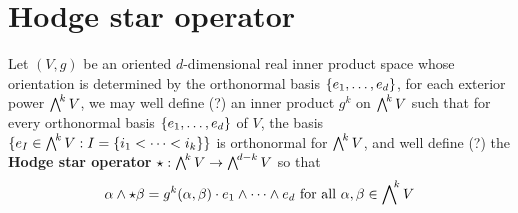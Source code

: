 \documentclass{report}
\begin{document}
\section{Hodge star operator}
Let $(V,g)$ be an oriented $d$-dimensional real inner product space whose orientation is determined by the orthonormal basis $\{ e_1,\dots ,e_d \}$, for each exterior power $\extp^k V$, we may well define (?) an inner product $g^k$ on $\extp^k V$ such that for every orthonormal basis $\{ e_1,\dots ,e_d \}$ of $V$, the basis  $\set{e_I \in \extp^k V:I=\set{i_1< \cdots <i_k}}$ is orthonormal for $\extp^k V$, and well define (?) the \textbf{Hodge star operator} $\star:\extp^k V \rightarrow \extp^{d-k} V$ so that 
\begin{align*}
\alpha \wedge \star \beta  = g^k(\alpha ,\beta ) \cdot e_1 \wedge  \cdots \wedge  e_d   \text{ for all }\alpha ,\beta  \in \extp^k V
\end{align*}
\end{document}
